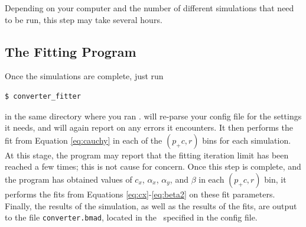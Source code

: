 \documentclass[12pt]{article}
\begin{document}
Depending on your computer and the number of different simulations that need to be run, this step may take several hours.


\subsection{The Fitting Program}

Once the simulations are complete, just run
\begin{verbatim}
$ converter_fitter
\end{verbatim}
in the same directory where you ran \exes.
\exef will re-parse your config file for the settings it needs, and will again report on any errors it encounters.
It then performs the fit from Equation \ref{eq:cauchy} in each of the $(p_+c, r)$ bins for each simulation.
At this stage, the program may report that the fitting iteration limit has been reached a few times; this is not cause for concern.
Once this step is complete, and the program has obtained values of $c_x$, $\alpha_x$, $\alpha_y$, and $\beta$ in each $(p_+c, r)$ bin,
it performs the fits from Equations \ref{eq:cx}-\ref{eq:beta2} on these fit parameters.
Finally, the results of the simulation, as well as the results of the fits, are output to the file \texttt{converter.bmad}, located in the \outdir \, specified in the config file.









\printbibliography
\end{document}
